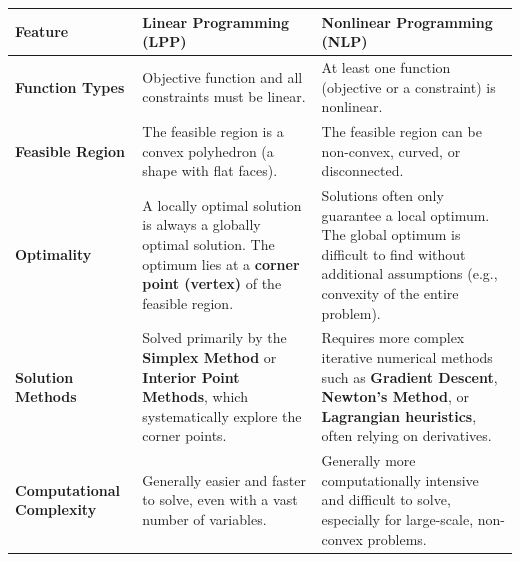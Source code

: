\documentclass[
  letterpaper,
  DIV=11,
  numbers=noendperiod]{scrreprt}
\begin{document}
\begin{longtable}[]{@{}
  >{\raggedright\arraybackslash}p{}
  >{\raggedright\arraybackslash}p{}
  >{\raggedright\arraybackslash}p{}@{}}
\toprule\noalign{}
\begin{minipage}[b]{\linewidth}\raggedright
Feature
\end{minipage} & \begin{minipage}[b]{\linewidth}\raggedright
Linear Programming (LPP)
\end{minipage} & \begin{minipage}[b]{\linewidth}\raggedright
Nonlinear Programming (NLP)
\end{minipage} \\
\midrule\noalign{}
\endhead
\bottomrule\noalign{}
\endlastfoot
\textbf{Function Types} & Objective function and all constraints must be
linear. & At least one function (objective or a constraint) is
nonlinear. \\
\textbf{Feasible Region} & The feasible region is a convex polyhedron (a
shape with flat faces). & The feasible region can be non-convex, curved,
or disconnected. \\
\textbf{Optimality} & A locally optimal solution is always a globally
optimal solution. The optimum lies at a \textbf{corner point (vertex)}
of the feasible region. & Solutions often only guarantee a local
optimum. The global optimum is difficult to find without additional
assumptions (e.g., convexity of the entire problem). \\
\textbf{Solution Methods} & Solved primarily by the \textbf{Simplex
Method} or \textbf{Interior Point Methods}, which systematically explore
the corner points. & Requires more complex iterative numerical methods
such as \textbf{Gradient Descent}, \textbf{Newton's Method}, or
\textbf{Lagrangian heuristics}, often relying on derivatives. \\
\textbf{Computational Complexity} & Generally easier and faster to
solve, even with a vast number of variables. & Generally more
computationally intensive and difficult to solve, especially for
large-scale, non-convex problems. \\
\end{longtable}
\end{document}
